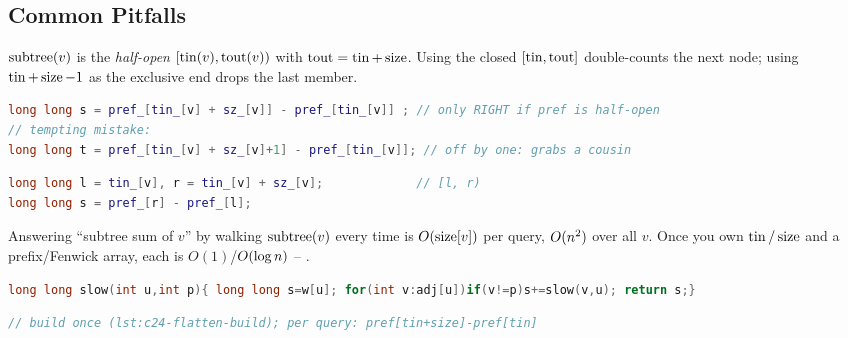 \subsection{Common Pitfalls}\label{sec:c24-flatten-pitfalls}

\begin{warningbox}
$\operatorname{subtree}(v)$ is the \emph{half-open} $[\operatorname{tin}(v), \operatorname{tout}(v))$ with $\operatorname{tout}=\operatorname{tin}+\operatorname{size}$. Using the
closed $[\operatorname{tin}, \operatorname{tout}]$ double-counts the next node; using $\operatorname{tin}+\operatorname{size}-1$ as the exclusive end
drops the last member.
\end{warningbox}
\begin{lstlisting}[caption={\textcolor{warningred}{WRONG}: closed interval, one too many}, language=C++, basicstyle=\ttfamily\small]
long long s = pref_[tin_[v] + sz_[v]] - pref_[tin_[v]] ; // only RIGHT if pref is half-open
// tempting mistake:
long long t = pref_[tin_[v] + sz_[v]+1] - pref_[tin_[v]]; // off by one: grabs a cousin
\end{lstlisting}
\begin{lstlisting}[caption={\textcolor{successgreen}{RIGHT}: exclusive end $=\tin+\size$}, language=C++, basicstyle=\ttfamily\small]
long long l = tin_[v], r = tin_[v] + sz_[v];             // [l, r)
long long s = pref_[r] - pref_[l];
\end{lstlisting}

\begin{warningbox}
Answering ``subtree sum of $v$'' by walking $\operatorname{subtree}(v)$ every time is $O(\operatorname{size}[v])$ per
query, $O(n^2)$ over all $v$. Once you own $\operatorname{tin}/\operatorname{size}$ and a prefix/Fenwick array, each
is $O(1)$/$O(\log n)$ -- .
\end{warningbox}
\begin{lstlisting}[caption={\textcolor{warningred}{WRONG}: DFS the subtree for each query}, language=C++, basicstyle=\ttfamily\small]
long long slow(int u,int p){ long long s=w[u]; for(int v:adj[u])if(v!=p)s+=slow(v,u); return s;}
\end{lstlisting}
\begin{lstlisting}[caption={\textcolor{successgreen}{RIGHT}: one flatten, then range reads}, language=C++, basicstyle=\ttfamily\small]
// build once (lst:c24-flatten-build); per query: pref[tin+size]-pref[tin]
\end{lstlisting}


